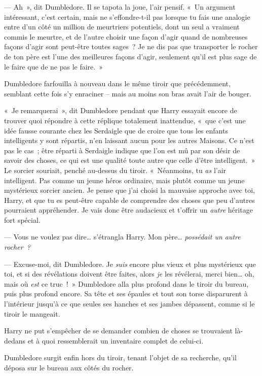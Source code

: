 --- Ah~», dit Dumbledore. Il se tapota la joue, l'air pensif. «~Un argument intéressant, c'est certain, mais ne s'effondre-t-il pas lorsque tu fais une analogie entre d'un côté un million de meurtriers potentiels, dont un seul a vraiment commis le meurtre, et de l'autre choisir une façon d'agir quand de nombreuses façons d'agir sont peut-être toutes sages~? Je ne dis pas que transporter le rocher de ton père est l'une des meilleures façons d'agir, seulement qu'il est plus sage de le faire que de ne pas le faire.~»

Dumbledore farfouilla à nouveau dans le même tiroir que précédemment, semblant cette fois s'y enraciner -- mais au moins son bras avait l'air de bouger.

«~Je remarquerai~», dit Dumbledore pendant que Harry essayait encore de trouver quoi répondre à cette réplique totalement inattendue, «~que c'est une idée fausse courante chez les Serdaigle que de croire que tous les enfants intelligents y sont répartis, n'en laissant aucun pour les autres Maisons. Ce n'est pas le cas~; être réparti à Serdaigle indique que l'on est mû par son désir de savoir des choses, ce qui est une qualité toute autre que celle d'être intelligent.~» Le sorcier souriait, penché au-dessus du tiroir. «~Néanmoins, tu \emph{as} l'air intelligent. Pas comme un jeune héros ordinaire, mais plutôt comme un jeune mystérieux sorcier ancien. Je pense que j'ai choisi la mauvaise approche avec toi, Harry, et que tu es peut-être capable de comprendre des choses que peu d'autres pourraient appréhender. Je vais donc être audacieux et t'offrir un \emph{autre} héritage fort spécial.

--- Vous ne voulez pas dire… s'étrangla Harry. Mon père… \emph{possédait un autre rocher~?}

--- Excuse-moi, dit Dumbledore. Je \emph{suis} encore plus vieux et plus mystérieux que toi, et si des révélations doivent être faites, alors \emph{je} les révélerai, merci bien… oh, mais où \emph{est} ce truc~!~» Dumbledore alla plus profond dans le tiroir du bureau, puis plus profond encore. Sa tête et ses épaules et tout son torse disparurent à l'intérieur jusqu'à ce que seules ses hanches et ses jambes dépassent, comme si le tiroir le mangeait.

Harry ne put s'empêcher de se demander combien de choses se trouvaient là-dedans et à quoi ressemblerait un inventaire complet de celui-ci.

Dumbledore surgit enfin hors du tiroir, tenant l'objet de sa recherche, qu'il déposa sur le bureau aux côtés du rocher.

